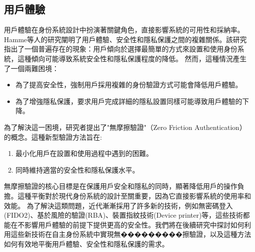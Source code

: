 \subsection{用戶體驗}
用戶體驗在身份系統設計中扮演著關鍵角色，直接影響系統的可用性和採納率。Hamme等人\cite{inproceedings}的研究闡明了用戶體驗、安全性和隱私保護之間的複雜關係。該研究指出了一個普遍存在的現象：用戶傾向於選擇最簡單的方式來設置和使用身份系統，這種傾向可能導致系統安全性和隱私保護程度的降低。\newline
然而，這種情況產生了一個兩難困境：
\begin{itemize}
  \item 為了提高安全性，強制用戶採用複雜的身份驗證方式可能會降低用戶體驗。
  \item 為了增強隱私保護，要求用戶完成詳細的隱私設置同樣可能導致用戶體驗的下降。
\end{itemize}
為了解決這一困境，研究者提出了"無摩擦驗證"（Zero Friction Authentication）的概念。這種新型驗證方法旨在:
\begin{enumerate}
  \item 最小化用戶在設置和使用過程中遇到的困難。
  \item 同時維持適當的安全性和隱私保護水平。
\end{enumerate}
無摩擦驗證的核心目標是在保護用戶安全和隱私的同時，顯著降低用戶的操作負擔。這種平衡對於現代身份系統的設計至關重要，因為它直接影響系統的使用率和效能。\newline
為了解決這類問題，近代漸漸採用了許多新的技術，例如無密碼登入(FIDO2)、基於風險的驗證(RBA)、裝置指紋技術(Device printer)等，這些技術都能在不影響用戶體驗的前提下提供更高的安全性。我們將在後續研究中探討如何利用這些新技術在自主身份系統中實現無���������擦驗證，以及這種方法如何有效地平衡用戶體驗、安全性和隱私保護的需求。
